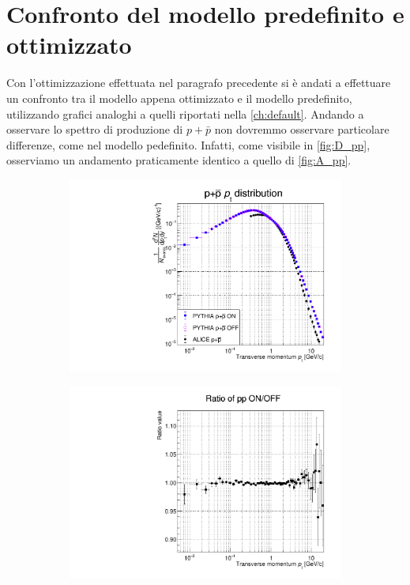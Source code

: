 \section{Confronto del modello predefinito e ottimizzato}
Con l'ottimizzazione effettuata nel paragrafo precedente si è andati a effettuare un confronto tra il modello appena ottimizzato e il modello predefinito, utilizzando grafici analoghi a quelli riportati nella \autoref{ch:default}.
Andando a osservare lo spettro di produzione di $p+\bar p$ non dovremmo osservare particolare differenze, come nel modello pedefinito.
Infatti, come visibile in \autoref{fig:D_pp}, osserviamo un andamento praticamente identico a quello di \autoref{fig:A_pp}.
\begin{figure}[htb]
    \centering
    \begin{subfigure}{.49\textwidth}
    \centering
        \includegraphics[width=\textwidth]{image/3-risultati/analyse/G/pp.pdf}
        \caption{}
        \label{fig:D_pp}
    \end{subfigure}
    \begin{subfigure}{.49\textwidth}
        \centering
        \includegraphics[width=\textwidth]{image/3-risultati/analyse/G/ratio_pp_ON_OFF.pdf}

\end{subfigure}
\end{figure}
